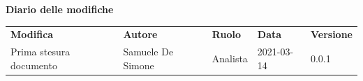 \documentclass[a4paper]{article}
\begin{document}
    \begin{center}
        \textbf{\Large Diario delle modifiche}\\
        \vspace{10px}
        \begin{table}[h!]
        \centering
        \renewcommand{\arraystretch}{1.8}
        \begin{tabular}{p{150px} p{90px} p{50px} p{60px} p{45px}}
            \rowcolor{logo!70} \textbf{Modifica} & \textbf{Autore} & \textbf{Ruolo} & \textbf{Data} & \textbf{Versione}\\
            Prima stesura documento & Samuele De Simone & Analista & 2021-03-14 & 0.0.1 \\    
        \end{tabular}
    \end{table}
    \end{center}

    \newpage
    \tableofcontents
    \newpage
    \appendix
    
    
    
    
    
    
    
    
    
    
    
    
    
    
    
    
    
    
    
    
    
    
    
    
    
    
\end{document}
